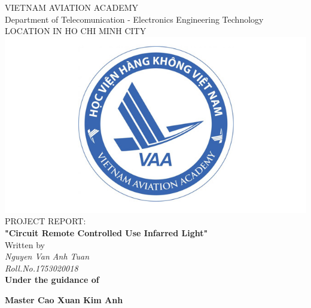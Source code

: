 \documentclass[a4paper]{report}
\begin{document}
    \centering
    \LARGE{\textsc{VIETNAM AVIATION ACADEMY}} \\
    \vspace{3mm}
    \normalsize{Department of Telecomunication - Electronics Engineering Technology} \\
    \vspace{3mm}
    \large{LOCATION IN HO CHI MINH CITY} \\
    \vspace{3mm}
    \includegraphics[scale=0.3]{download.jpg} \\
    \vspace{3mm}
    \normalsize{PROJECT REPORT:} \\
    \vspace{15mm}
    \huge{\textbf{"Circuit Remote Controlled Use Infarred Light"}} \\
    \vspace{20mm}
    \normalsize{Written by} \\
    \vspace{3mm}
    \large{\textit{Nguyen Van Anh Tuan}} \\ 
    \vspace{3mm}
    \textit{\large{Roll.No.1753020018}} \\
    \vspace{15mm}
    \textbf{\large{Under the guidance of}} \\
    \vspace{10mm}
    \centerline{\textbf{\large{Master Cao Xuan Kim Anh}}}

    \pagestyle{fancy}
    \fancyhf{}
    \fancyfoot[CE,CO]{\leftmark}
    \fancyfoot[LE,RO]{\thepage}
    \renewcommand{\headrulewidth}{2pt}
    \renewcommand{\footrulewidth}{1pt}
\end{document}
